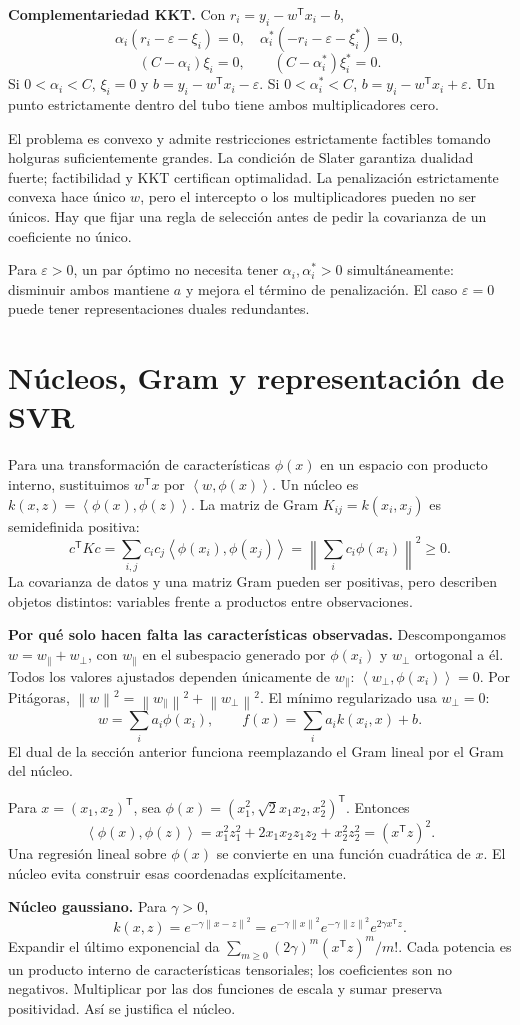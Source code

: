 \documentclass[11pt,a4paper]{article}
\newcommand{\T}{^{\mathsf T}}
\newcommand{\norm}[1]{\left\lVert #1\right\rVert}
\newcommand{\ip}[2]{\left\langle #1,#2\right\rangle}
\newcommand{\topic}[2]{\clearpage\section{#1}\label{#2}}
\theoremstyle{definition}\newtheorem{definicion}[teorema]{Definición}
\begin{document}
\textbf{Complementariedad KKT.}
Con $r_i=y_i-w\T x_i-b$,
\[
\alpha_i(r_i-\varepsilon-\xi_i)=0,\quad
\alpha_i^*(-r_i-\varepsilon-\xi_i^*)=0,
\]
\[
(C-\alpha_i)\xi_i=0,\qquad
(C-\alpha_i^*)\xi_i^*=0.
\]
Si $0<\alpha_i<C$, $\xi_i=0$ y
$b=y_i-w\T x_i-\varepsilon$.
Si $0<\alpha_i^*<C$, $b=y_i-w\T x_i+\varepsilon$.
Un punto estrictamente dentro del tubo tiene ambos multiplicadores cero.

\begin{idea}
El problema es convexo y admite restricciones estrictamente factibles
tomando holguras suficientemente grandes. La condición de Slater \cite{boyd} garantiza
dualidad fuerte; factibilidad y KKT certifican optimalidad.
La penalización estrictamente convexa hace único $w$, pero el intercepto
o los multiplicadores pueden no ser únicos. Hay que fijar una regla de
selección antes de pedir la covarianza de un coeficiente no único.
\end{idea}
Para $\varepsilon>0$, un par óptimo no necesita tener
$\alpha_i,\alpha_i^*>0$ simultáneamente: disminuir ambos mantiene $a$ y
mejora el término de penalización. El caso $\varepsilon=0$ puede tener
representaciones duales redundantes.

\topic{Núcleos, Gram y representación de SVR}{s51}
Para una transformación de características $\phi(x)$ en un espacio
con producto interno, sustituimos $w\T x$ por
$\ip w{\phi(x)}$.
Un núcleo es $k(x,z)=\ip{\phi(x)}{\phi(z)}$.
La matriz de Gram $K_{ij}=k(x_i,x_j)$ es semidefinida positiva:
\[
c\T Kc=\sum_{i,j}c_ic_j\ip{\phi(x_i)}{\phi(x_j)}
=\norm{\sum_i c_i\phi(x_i)}^2\ge0.
\]
La covarianza de datos y una matriz Gram pueden ser positivas, pero
describen objetos distintos: variables frente a productos entre observaciones.

\textbf{Por qué solo hacen falta las características observadas.}
Descompongamos $w=w_\parallel+w_\perp$, con $w_\parallel$ en el
subespacio generado por $\phi(x_i)$ y $w_\perp$ ortogonal a él.
Todos los valores ajustados dependen únicamente de $w_\parallel$:
$\ip{w_\perp}{\phi(x_i)}=0$.
Por Pitágoras,
$\norm w^2=\norm{w_\parallel}^2+\norm{w_\perp}^2$.
El mínimo regularizado usa $w_\perp=0$:
\[
w=\sum_i a_i\phi(x_i),\qquad
\boxed{f(x)=\sum_i a_i k(x_i,x)+b}.
\]
El dual de la sección anterior funciona reemplazando el Gram lineal por
el Gram del núcleo.

\begin{ejemplo}
Para $x=(x_1,x_2)\T$, sea
$\phi(x)=(x_1^2,\sqrt2x_1x_2,x_2^2)\T$.
Entonces
\[
\ip{\phi(x)}{\phi(z)}
=x_1^2z_1^2+2x_1x_2z_1z_2+x_2^2z_2^2=(x\T z)^2.
\]
Una regresión lineal sobre $\phi(x)$ se convierte en una función cuadrática
de $x$. El núcleo evita construir esas coordenadas explícitamente.
\end{ejemplo}
\textbf{Núcleo gaussiano.}
Para $\gamma>0$,
\[
k(x,z)=e^{-\gamma\norm{x-z}^2}
=e^{-\gamma\norm x^2}e^{-\gamma\norm z^2}e^{2\gamma x\T z}.
\]
Expandir el último exponencial da
$\sum_{m\ge0}(2\gamma)^m(x\T z)^m/m!$.
Cada potencia es un producto interno de características tensoriales;
los coeficientes son no negativos. Multiplicar por las dos funciones
de escala y sumar preserva positividad. Así se justifica el núcleo.
\end{document}
